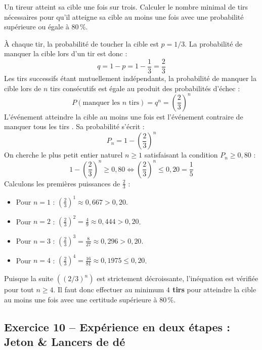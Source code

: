 \documentclass[11pt,a4paper]{article}
\begin{document}
Un tireur atteint sa cible une fois sur trois. Calculer le nombre minimal de tirs nécessaires pour qu'il atteigne sa cible au moins une fois avec une probabilité supérieure ou égale à $80\,\%$.

\begin{correctionbox}
À chaque tir, la probabilité de toucher la cible est $p = 1/3$. La probabilité de manquer la cible lors d'un tir est donc :
\[
q = 1 - p = 1 - \frac{1}{3} = \frac{2}{3}
\]
Les tirs successifs étant mutuellement indépendants, la probabilité de manquer la cible lors de $n$ tirs consécutifs est égale au produit des probabilités d'échec :
\[
P(\text{manquer les } n \text{ tirs}) = q^n = \left(\frac{2}{3}\right)^n
\]
L'événement \og atteindre la cible au moins une fois \fg{} est l'événement contraire de \og manquer tous les tirs \fg{}. Sa probabilité s'écrit :
\[
P_n = 1 - \left(\frac{2}{3}\right)^n
\]
On cherche le plus petit entier naturel $n \ge 1$ satisfaisant la condition $P_n \ge 0{,}80$ :
\[
1 - \left(\frac{2}{3}\right)^n \ge 0{,}80 \iff \left(\frac{2}{3}\right)^n \le 0{,}20 = \frac{1}{5}
\]
Calculons les premières puissances de $\frac{2}{3}$ :
\begin{itemize}[label=$\bullet$]
    \item Pour $n = 1$ : $\left(\frac{2}{3}\right)^1 \approx 0{,}667 > 0{,}20$.
    \item Pour $n = 2$ : $\left(\frac{2}{3}\right)^2 = \frac{4}{9} \approx 0{,}444 > 0{,}20$.
    \item Pour $n = 3$ : $\left(\frac{2}{3}\right)^3 = \frac{8}{27} \approx 0{,}296 > 0{,}20$.
    \item Pour $n = 4$ : $\left(\frac{2}{3}\right)^4 = \frac{16}{81} \approx 0{,}1975 \le 0{,}20$.
\end{itemize}
Puisque la suite $\left((2/3)^n\right)$ est strictement décroissante, l'inéquation est vérifiée pour tout $n \ge 4$.
Il faut donc effectuer au minimum \textbf{$4$ tirs} pour atteindre la cible au moins une fois avec une certitude supérieure à $80\,\%$.
\end{correctionbox}

\vspace{0.3cm}

\subsection*{Exercice 10 -- Expérience en deux étapes : Jeton \& Lancers de dé}
\end{document}
